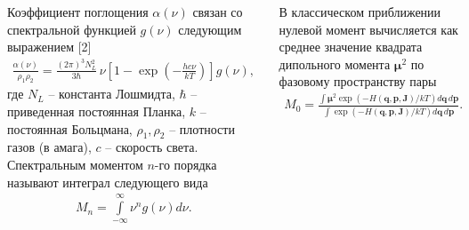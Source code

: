 \documentclass[
  14pt,
  a1paper,
  portrait, 
  margin=0mm,
  innermargin=15mm,
  blockverticalspace=0mm,
  colspace=0mm,
  subcolspace=0mm
]{tikzposter}
\newcommand{\lb}{\left(}
\newcommand{\rb}{\right)}
\begin{document}
\begin{columns}
{	Коэффициент поглощения $\alpha(\nu)$ связан со спектральной функцией $g(\nu)$ следующим выражением [2] 
	\begin{gather}
		\frac{\alpha \lb \nu \rb}{\rho_1 \rho_2} = \frac{\lb 2 \pi \rb^3 N_L^2}{3 \hbar} \, \nu \left[ 1 - \exp \lb - \frac{h c \nu}{k T} \rb \right] g \lb \nu \rb, \label{0.2}
\end{gather}
где $N_L$ -- константа Лошмидта, $\hbar$ -- приведенная постоянная Планка, $k$ -- постоянная Больцмана, $\rho_1, \rho_2$ -- плотности газов (в амага), $c$ -- скорость света. Спектральным моментом $n$-го порядка называют интеграл следующего вида
\vspace*{-0.5cm}
\begin{gather}
	M_n = \int\limits_{-\infty}^{\infty} \nu^n g(\nu) d \nu. \label{0.3}
\end{gather}

В классическом приближении нулевой момент вычисляется как среднее значение квадрата дипольного момента $\boldsymbol{\mu}^2$ по фазовому пространству пары 
\begin{gather}
	M_0 = \displaystyle \frac{\int \boldsymbol{\mu}^2 \exp \lb -H \lb \mathbf{q}, \mathbf{p}, \mathbf{J} \rb / k T \rb d \mathbf{q} \, d \mathbf{p}}{\int \exp \lb - H \lb \mathbf{q}, \mathbf{p}, \mathbf{J} \rb / k T \rb d \mathbf{q} \, d \mathbf{p}} \label{0.4}. 
\end{gather}

}


\end{columns}
\end{document}
